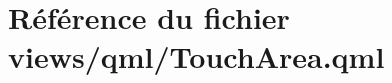 \hypertarget{TouchArea_8qml}{\section{Référence du fichier views/qml/\-Touch\-Area.qml}
\label{TouchArea_8qml}
}
